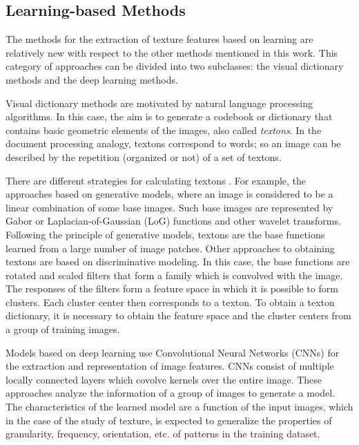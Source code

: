 \subsection{Learning-based Methods}
The methods for the extraction of texture features based on learning are relatively new with respect to the other methods mentioned in this work.
This category of approaches can be divided into two subclasses: the visual dictionary methods and the deep learning methods.

Visual dictionary methods are motivated by natural language processing algorithms. In this case, the aim is to generate a codebook or dictionary that contains basic geometric elements of the images, also called \textit{textons}. In the document processing analogy, textons correspond to words; so an image can be described by the repetition (organized or not) of a set of textons.

There are different strategies for calculating textons \citep{Zhu.Guo.ea:IJCV:2005}. For example, the approaches based on generative models, where an image is considered to be a linear combination of some base images. Such base images are represented by Gabor or Laplacian-of-Gaussian (LoG) functions and other wavelet transforms. Following the principle of generative models, textons are the base functions learned from a large number of image patches.
Other approaches to obtaining textons are based on discriminative modeling. In this case, the base functions are rotated and scaled filters that form a family which is convolved with the image. The responses of the filters form a feature space  in which it is possible to form clusters. Each cluster center then corresponds to a texton. To obtain a texton dictionary, it is necessary to obtain the feature space and the cluster centers from a group of training images.

Models based on deep learning use Convolutional Neural Networks (CNNs) for the extraction and representation of image features. CNNs consist of multiple locally connected layers which covolve kernels over the entire image. These approaches analyze the information of a group of images to generate a model. The characteristics of the learned model are a function of the input images, which in the case of the study of texture, is expected to generalize the properties of granularity, frequency, orientation, etc. of patterns in the training dataset.



